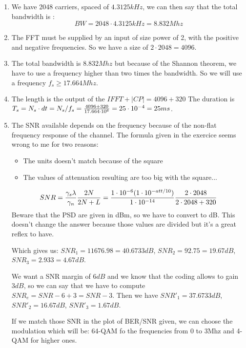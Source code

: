 
\begin{solution}
	\begin{enumerate}
		\item We have 2048 carriers, spaced of $4.3125kHz$, we can then say that the total bandwidth is : 
			  $$BW = 2048\cdot 4.3125kHz = 8.832 Mhz$$
		\item The FFT must be supplied by an input of size power of 2, with the positive and negative frequencies. So we have a size of $2\cdot 2048 = 4096$.
		\item The total bandwidth is $8.832 Mhz$ but because of the Shannon theorem, we have to use a frequency higher than two times the bandwidth. So we will use a frequency $f_s \geq 17.664Mhz$.
		\item The length is the output of the $IFFT + |CP| = 4096 + 320$ The duration is $T_s = N_s \cdot dt = N_s/f_s = \frac{4096 + 320}{17.664\cdot 10^{6}} = 25\cdot 10^{-4} = 25ms$.
		\item The SNR available depends on the frequency because of the non-flat frequency response of the channel. The formula given in the exercice seems wrong to me for two reasons:
		\begin{itemize}
			\item The units doesn't match because of the square
			\item The values of attenuation resulting are too big with the square...
		\end{itemize}				
		
		$$
		SNR = \frac{\gamma_s \lambda}{\gamma_n}\frac{2N}{2N + L} = \frac{1\cdot 10^{-6} (1\cdot 10^{-att/10})}{1\cdot 10^{-14}}\frac{2\cdot 2048}{2\cdot 2048 + 320}
		$$
		Beware that the PSD are given in dBm, so we have to convert to dB. This doesn't change the answer because those values are divided but it's a great reflex to have.
		
		
		Which gives us: $SNR_{1} = 11676.98 = 40.6733 dB$, $SNR_{2} = 92.75 = 19.67 dB$, $SNR_{3} = 2.933 = 4.67 dB$.
		
		We want a SNR margin of $6dB$ and we know that the coding allows to gain $3dB$, so we can say that we have to compute $SNR_e = SNR - 6 + 3 = SNR - 3$.
		Then we have $SNR'_{1} = 37.6733 dB$, $SNR'_{2} = 16.67 dB$, $SNR'_{3} = 1.67 dB$.
		
		If we match those SNR in the plot of BER/SNR given, we can choose the modulation which will be: 64-QAM fo the frequencies from 0 to 3Mhz and 4-QAM for higher ones.
		
	\end{enumerate}
\end{solution}
\nosolution